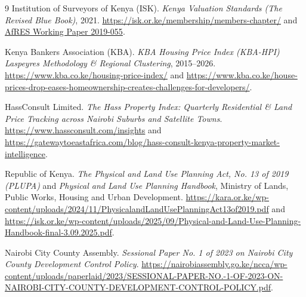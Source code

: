 \documentclass[11pt,a4paper]{article}
\begin{document}
\begin{thebibliography}{9}
Institution of Surveyors of Kenya (ISK). \textit{Kenya Valuation Standards (The Revised Blue Book)}, 2021. \url{https://isk.or.ke/membership/members-chapter/} and \href{https://ideas.repec.org/p/afr/wpaper/2019-055.html}{AfRES Working Paper 2019-055}.

Kenya Bankers Association (KBA). \textit{KBA Housing Price Index (KBA-HPI) Laspeyres Methodology \& Regional Clustering}, 2015--2026. \url{https://www.kba.co.ke/housing-price-index/} and \url{https://www.kba.co.ke/house-prices-drop-eases-homeownership-creates-challenges-for-developers/}.

HassConsult Limited. \textit{The Hass Property Index: Quarterly Residential \& Land Price Tracking across Nairobi Suburbs and Satellite Towns}. \url{https://www.hassconsult.com/insights} and \url{https://gatewaytoeastafrica.com/blog/hass-consult-kenya-property-market-intelligence}.

Republic of Kenya. \textit{The Physical and Land Use Planning Act, No. 13 of 2019 (PLUPA)} and \textit{Physical and Land Use Planning Handbook}, Ministry of Lands, Public Works, Housing and Urban Development. \url{https://kara.or.ke/wp-content/uploads/2024/11/PhysicalandLandUsePlanningAct13of2019.pdf} and \url{https://isk.or.ke/wp-content/uploads/2025/09/Physical-and-Land-Use-Planning-Handbook-final-3.09.2025.pdf}.

Nairobi City County Assembly. \textit{Sessional Paper No. 1 of 2023 on Nairobi City County Development Control Policy}. \url{https://nairobiassembly.go.ke/ncca/wp-content/uploads/paperlaid/2023/SESSIONAL-PAPER-NO.-1-OF-2023-ON-NAIROBI-CITY-COUNTY-DEVELOPMENT-CONTROL-POLICY.pdf}.
\end{thebibliography}
\end{document}
